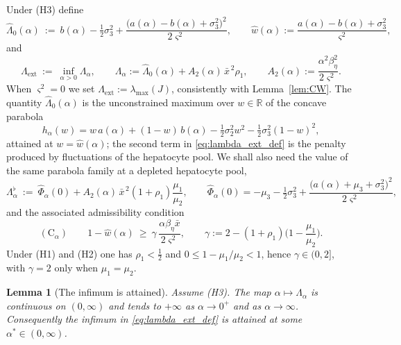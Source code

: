 \documentclass{article}
\newtheorem{lemma}{Lemma}[section]
\newcommand{\betaeta}{\beta_\eta}
\newcommand{\Lext}{\Lambda_{\mathrm{ext}}}
\begin{document}
Under (H3) define
\begin{equation}\label{eq:L0hat}
\widehat\Lambda_0(\alpha)\ :=\ b(\alpha)-\tfrac12\sigma_3^2+\frac{\big(a(\alpha)-b(\alpha)+\sigma_3^2\big)^2}{2\varsigma^2},\qquad
\widehat w(\alpha):=\frac{a(\alpha)-b(\alpha)+\sigma_3^2}{\varsigma^2},
\end{equation}
and
\begin{equation}\label{eq:lambda_ext_def}
\boxed{\ \Lext\ :=\ \inf_{\alpha>0}\Lambda_\alpha,\qquad \Lambda_\alpha:=\widehat\Lambda_0(\alpha)+A_2(\alpha)\,\bar x^{\,2}\rho_1,\qquad A_2(\alpha):=\frac{\alpha^2\betaeta^2}{2\varsigma^2}.\ }
\end{equation}
When $\varsigma^2=0$ we set $\Lext:=\lambda_{\max}(J)$, consistently with Lemma~\ref{lem:CW}. The quantity $\widehat\Lambda_0(\alpha)$ is the unconstrained maximum over $w\in\mathbb{R}$ of the concave parabola
\begin{equation}\label{eq:h_function}
h_\alpha(w)=w\,a(\alpha)+(1-w)\,b(\alpha)-\tfrac12\sigma_2^2w^2-\tfrac12\sigma_3^2(1-w)^2 ,
\end{equation}
attained at $w=\widehat w(\alpha)$; the second term in \eqref{eq:lambda_ext_def} is the penalty produced by fluctuations of the hepatocyte pool. We shall also need the value of the same parabola family at a depleted hepatocyte pool,
\begin{equation}\label{eq:Lflat}
\Lambda_\alpha^{\flat}\ :=\ \widehat\Phi_\alpha(0)+A_2(\alpha)\,\bar x^{\,2}(1+\rho_1)\frac{\mu_1}{\mu_2},\qquad
\widehat\Phi_\alpha(0)=-\mu_3-\tfrac12\sigma_3^2+\frac{\big(a(\alpha)+\mu_3+\sigma_3^2\big)^2}{2\varsigma^2},
\end{equation}
and the associated admissibility condition
\begin{equation}\label{eq:condC}
(\mathrm{C}_\alpha)\qquad 1-\widehat w(\alpha)\ \ge\ \gamma\,\frac{\alpha\betaeta\bar x}{2\varsigma^2},\qquad \gamma:=2-(1+\rho_1)\Big(1-\frac{\mu_1}{\mu_2}\Big).
\end{equation}
Under (H1) and (H2) one has $\rho_1<\tfrac12$ and $0\le1-\mu_1/\mu_2<1$, hence $\gamma\in(0,2]$, with $\gamma=2$ only when $\mu_1=\mu_2$.

\begin{lemma}[The infimum is attained]\label{lem:attain}
Assume (H3). The map $\alpha\mapsto\Lambda_\alpha$ is continuous on $(0,\infty)$ and tends to $+\infty$ as $\alpha\to0^+$ and as $\alpha\to\infty$. Consequently the infimum in \eqref{eq:lambda_ext_def} is attained at some $\alpha^\ast\in(0,\infty)$.
\end{lemma}
\end{document}
